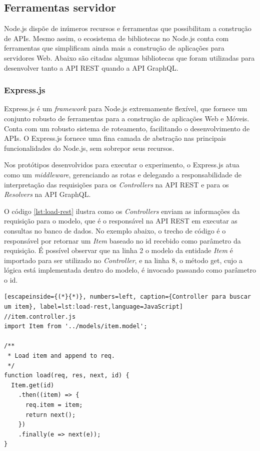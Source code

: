\subsection{Ferramentas servidor}

Node.js dispõe de inúmeros recursos e ferramentas que possibilitam a construção de APIs. Mesmo assim, o ecosistema de bibliotecas no Node.js conta com ferramentas que simplificam ainda mais a construção de aplicações para servidores Web. Abaixo são citadas algumas bibliotecas que foram utilizadas para desenvolver tanto a API REST quando a API GraphQL. 

\subsubsection*{Express.js}

Express.js é um \textit{framework} para Node.js extremamente flexível, que fornece um conjunto robusto de ferramentas para a construção de aplicações Web e Móveis. Conta com um robusto sistema de roteamento, facilitando o desenvolvimento de APIs. O Express.js fornece uma fina camada de abstração nas principais funcionalidades do Node.js, sem sobrepor seus recursos.

Nos protótipos desenvolvidos para executar o experimento, o Express.js atua como um \textit{middleware}, gerenciando as rotas e delegando a responsabilidade de interpretação das requisições para os \textit{Controllers} na API REST e para os \textit{Resolvers} na API GraphQL.

O código \ref{lst:load-rest} ilustra como os \textit{Controllers} enviam as informações da requisição para o modelo, que é o responsável na API REST em executar as consultas no banco de dados. No exemplo abaixo, o trecho de código é o responsável por retornar um \textit{Item} baseado no \textup{id} recebido como parâmetro da requisição. É possível observar que na linha 2 o modelo da entidade \textit{Item} é importado para ser utilizado no \textit{Controller}, e na linha 8, o método \textup{get}, cujo a lógica está implementada dentro do modelo, é invocado passando como parâmetro o \textup{id}.

\begin{lstlisting}[escapeinside={(*}{*)}, numbers=left, caption={Controller para buscar um item}, label=lst:load-rest,language=JavaScript]
//item.controller.js
import Item from '../models/item.model';

/**
 * Load item and append to req.
 */
function load(req, res, next, id) {
  Item.get(id)
    .then((item) => {
      req.item = item;
      return next();
    })
    .finally(e => next(e));
}

\end{lstlisting}

